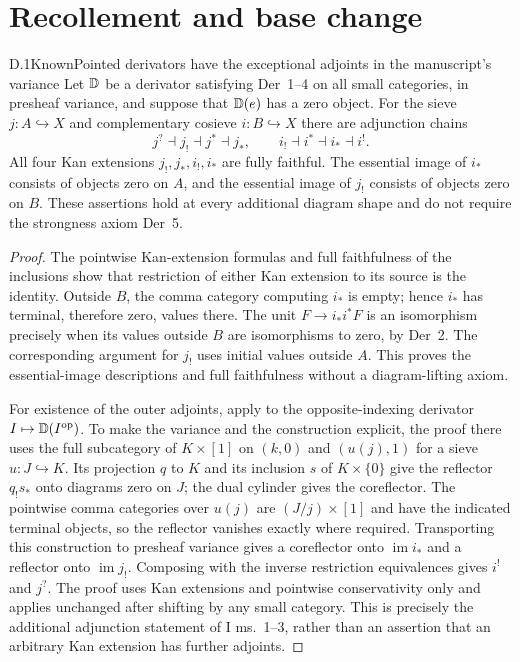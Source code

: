 \section{Recollement and base change}

\begin{statement}{D.1}{Known}{Pointed derivators have the exceptional adjoints in the manuscript's variance}
Let $\mathbb D$ be a derivator satisfying Der~1--4 on all small categories, in presheaf variance, and suppose that $\mathbb D(e)$ has a zero object. For the sieve $j:A\hookrightarrow X$ and complementary cosieve $i:B\hookrightarrow X$ there are adjunction chains
\[
 j^?\dashv j_!\dashv j^*\dashv j_* ,
 \qquad i_!\dashv i^*\dashv i_*\dashv i^!.
\]
All four Kan extensions $j_!,j_*,i_!,i_*$ are fully faithful. The essential image of $i_*$ consists of objects zero on $A$, and the essential image of $j_!$ consists of objects zero on $B$. These assertions hold at every additional diagram shape and do not require the strongness axiom Der~5.
\end{statement}
\begin{proof}
The pointwise Kan-extension formulas and full faithfulness of the inclusions show that restriction of either Kan extension to its source is the identity. Outside $B$, the comma category computing $i_*$ is empty; hence $i_*$ has terminal, therefore zero, values there. The unit $F\to i_*i^*F$ is an isomorphism precisely when its values outside $B$ are isomorphisms to zero, by Der~2. The corresponding argument for $j_!$ uses initial values outside $A$. This proves the essential-image descriptions and full faithfulness without a diagram-lifting axiom.

For existence of the outer adjoints, apply \citet[Lemma~3.7 and Corollary~3.8]{CDGroth2013} to the opposite-indexing derivator $I\mapsto\mathbb D(I^{\mathrm{op}})$. To make the variance and the construction explicit, the proof there uses the full subcategory of $K\times[1]$ on $(k,0)$ and $(u(j),1)$ for a sieve $u:J\hookrightarrow K$. Its projection $q$ to $K$ and its inclusion $s$ of $K\times\{0\}$ give the reflector $q_!s_*$ onto diagrams zero on $J$; the dual cylinder gives the coreflector. The pointwise comma categories over $u(j)$ are $(J/j)\times[1]$ and have the indicated terminal objects, so the reflector vanishes exactly where required. Transporting this construction to presheaf variance gives a coreflector onto $\operatorname{im}i_*$ and a reflector onto $\operatorname{im}j_!$. Composing with the inverse restriction equivalences gives $i^!$ and $j^?$. The proof uses Kan extensions and pointwise conservativity only and applies unchanged after shifting by any small category. This is precisely the additional adjunction statement of I ms.~1--3, rather than an assertion that an arbitrary Kan extension has further adjoints.
\end{proof}

